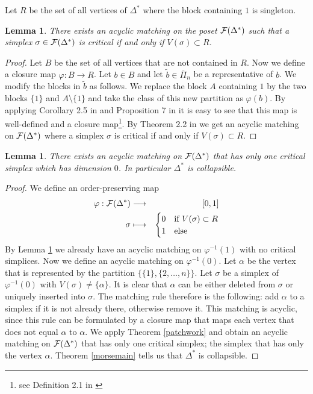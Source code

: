 \documentclass{elsarticle}
\newtheorem{lem}[df]{Lemma}
\begin{document}
Let $R$ be the set of all vertices of $\Delta^*$ where the block containing $1$ is singleton.
\begin{lem}
\label{simplclosure}
There exists an acyclic matching on the poset ${\cal F}(\Delta^*)$ such that a simplex $\sigma\in{\cal F}(\Delta^*)$ is critical if and only if  $V(\sigma)\subset R$.
\end{lem}
\begin{proof}
Let $B$ be the set of all vertices that are not contained in $R$. Now we define a closure map $\varphi:B\longrightarrow R$. Let $b\in B$ and let $\tilde b\in\overline{\Pi}_n$ be a representative of $b$. We modify the blocks in $\tilde b$ as follows. We replace the block $A$ containing $1$ by the two blocks $\{1\}$ and $A\setminus\{1\}$ and take the class of this new partition as $\varphi(b)$. By applying Corollary 2.5 in \cite{clmap} and Proposition 7 in \cite{jule} it is easy to see that this map is well-defined and a closure map\footnote{see Definition 2.1 in \cite{clmap}}. By Theorem 2.2 in \cite{clmap} we get an acyclic matching on ${\cal F}(\Delta^*)$ where a simplex $\sigma$ is critical if and only if  $V(\sigma)\subset R$.
\end{proof}
\begin{lem}
\label{mitte}
There exists an acyclic matching on ${\cal F}(\Delta^*)$ that has only one critical simplex which has dimension $0$. In particular $\Delta^*$ is collapsible.
\end{lem}
\begin{proof}
We define an order-preserving map
\begin{eqnarray*}
\varphi:{\cal F}(\Delta^*)&\longrightarrow&[0,1]\\
\sigma&\longmapsto&
\begin{cases}
0&\text{if $V(\sigma)\subset R$}\\
1&\text{else}
\end{cases}
\end{eqnarray*}
By Lemma \ref{simplclosure} we already have an acyclic matching on $\varphi^{-1}(1)$ with no critical simplices. Now we define an acyclic matching on $\varphi^{-1}(0)$. Let $\alpha$ be the vertex that is represented by the partition $\{\{1\},\{2,\dots,n\}\}$. Let $\sigma$ be a simplex of $\varphi^{-1}(0)$ with $V(\sigma)\not=\{\alpha\}$. It is clear that $\alpha$ can be either deleted from $\sigma$ or uniquely inserted into $\sigma$. The matching rule therefore is the following: add $\alpha$ to a simplex if it is not already there, otherwise remove it. This matching is acyclic, since this rule can be formulated by a closure map that maps each vertex that does not equal $\alpha$ to $\alpha$. We apply Theorem \ref{patchwork} and obtain an acyclic matching on ${\cal F}(\Delta^*)$ that has only one critical simplex; the simplex that has only the vertex $\alpha$. Theorem \ref{morsemain} tells us that $\Delta^*$ is collapsible.
\end{proof}
\end{document}
